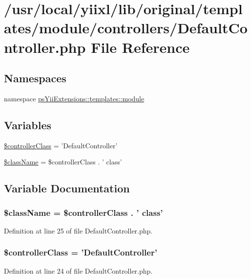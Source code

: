 \hypertarget{DefaultController_8php}{
\section{/usr/local/yiixl/lib/original/templates/module/controllers/DefaultController.php File Reference}
\label{DefaultController_8php}
}
\subsection*{Namespaces}
\begin{DoxyCompactItemize}
\item 
namespace \hyperlink{namespacepsYiiExtensions_1_1templates_1_1module}{psYiiExtensions::templates::module}
\end{DoxyCompactItemize}
\subsection*{Variables}
\begin{DoxyCompactItemize}
\item 
\hyperlink{DefaultController_8php_ae59cce8aa29e170d0f225cea7d0a14fd}{\$controllerClass} = 'DefaultController'
\item 
\hyperlink{DefaultController_8php_acd6a475a6eeb092f4eea3e19e502d67d}{\$className} = \$controllerClass . ' class'
\end{DoxyCompactItemize}


\subsection{Variable Documentation}
\hypertarget{DefaultController_8php_acd6a475a6eeb092f4eea3e19e502d67d}{
\subsubsection[{\$className}]{\setlength{\rightskip}{0pt plus 5cm}\$className = \$controllerClass . ' class'}}
\label{DefaultController_8php_acd6a475a6eeb092f4eea3e19e502d67d}


Definition at line 25 of file DefaultController.php.

\hypertarget{DefaultController_8php_ae59cce8aa29e170d0f225cea7d0a14fd}{
\subsubsection[{\$controllerClass}]{\setlength{\rightskip}{0pt plus 5cm}\$controllerClass = 'DefaultController'}}
\label{DefaultController_8php_ae59cce8aa29e170d0f225cea7d0a14fd}


Definition at line 24 of file DefaultController.php.

